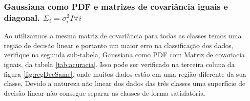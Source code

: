 \documentclass[ 
	article,			%
	11pt,				%
	oneside,			%
	a4paper,			%
	english,			%
	brazil,				%
	]{abntex2}
\begin{document}
\subsubsection{ Gaussiana como PDF e matrizes de covariância iguais e diagonal. $\Sigma_i=\sigma^2_iI
\forall i$}
\label{sss:RDcovIguaDiag}
  Ao utilizarmos a mesma matriz de covariância para todas as classes 
temos uma região de decisão linear e portanto um maior erro na classificação dos
dados, verifique na segunda sub-tabela, Gaussiana como PDF com Matriz de
covariacia iguais, da tabela \ref{tab:acuracia}.
Isso pode ser verificado na terceira coluna da figura \ref{fig:regDecSame},
onde muitos dados estão em uma região diferente da sua classe.
Devido a natureza não linear dos dados das três classes uma superfície de decisão linear não
consegue separar as classes de forma satisfatória.
\end{document}
